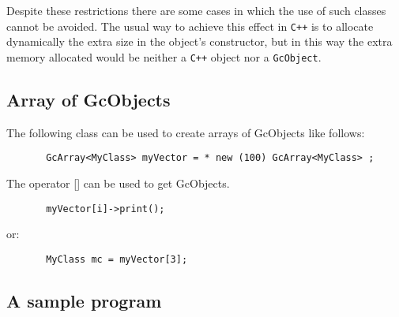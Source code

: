 Despite these restrictions there are some cases in which the use of such
classes cannot be avoided. The usual way to achieve this effect in {\tt C++}
is to allocate dynamically the extra size in the object's constructor, but in
this way the extra memory allocated would be neither a {\tt C++} object nor
a {\tt GcObject}.

\subsection {Array of GcObjects}

The following class can be used to create arrays of GcObjects
like follows:

\begin{verbatim}
       GcArray<MyClass> myVector = * new (100) GcArray<MyClass> ;
\end{verbatim}
       
The operator [] can be used to get GcObjects.

\begin{verbatim}
       myVector[i]->print();
\end{verbatim}
or:
\begin{verbatim}
       MyClass mc = myVector[3];
\end{verbatim}

\subsection{A sample program}

